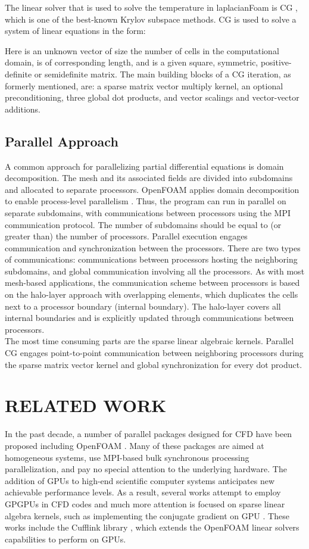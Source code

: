 \documentclass[3p,times]{elsarticle}
\begin{document}
The linear solver that is used to solve the temperature in laplacianFoam is CG \cite{saad_book}, which is one of the best-known Krylov subspace methods. CG is used to solve a system of linear equations in the form:

Here \emph{} is an unknown vector of size the number of cells in the computational domain, \emph{} is of corresponding length, and \emph{} is a given square, symmetric, positive-definite or semidefinite matrix. The main building blocks of a CG iteration, as formerly mentioned, are: a sparse matrix vector multiply kernel, an optional preconditioning,  three global dot products, and vector scalings and vector-vector additions. 


\subsection{Parallel Approach} 
A common approach for parallelizing partial differential equations is domain decomposition. The mesh and its associated fields are divided into subdomains and allocated to separate processors. OpenFOAM applies domain decomposition to enable process-level parallelism \cite{openfoam}. Thus, the program can run in parallel on separate subdomains, with communications between processors using the MPI communication protocol. The number of subdomains should be equal to (or greater than) the number of processors. Parallel execution engages communication and synchronization between the processors. There are two types of communications: communications between processors hosting the neighboring subdomains, and global communication involving all the processors. As with most mesh-based applications, the communication scheme between processors is based on the halo-layer approach with overlapping elements, which duplicates the cells next to a processor boundary (internal boundary). The halo-layer covers all internal boundaries and is explicitly updated through communications between processors. \\

The most time consuming parts are the sparse linear algebraic kernels. Parallel CG engages point-to-point communication between neighboring processors during the sparse matrix vector kernel and global synchronization for every dot product. 

\section{RELATED WORK}
In the past decade, a number of parallel packages designed for CFD have been proposed including OpenFOAM \cite{openfoam}. Many of these packages are aimed at homogeneous systems, use MPI-based bulk synchronous processing parallelization, and pay no special attention to the underlying hardware. The addition of GPUs to high-end scientific computer systems anticipates new achievable performance levels. As a result, several works attempt to employ GPGPUs in CFD codes and much more attention is focused on sparse linear algebra kernels, such as implementing the conjugate gradient on GPU \cite{ament2010parallel}. These works include the Cufflink library \cite{Cufflink}, which extends the OpenFOAM linear solvers capabilities to perform on GPUs. \\
\end{document}
